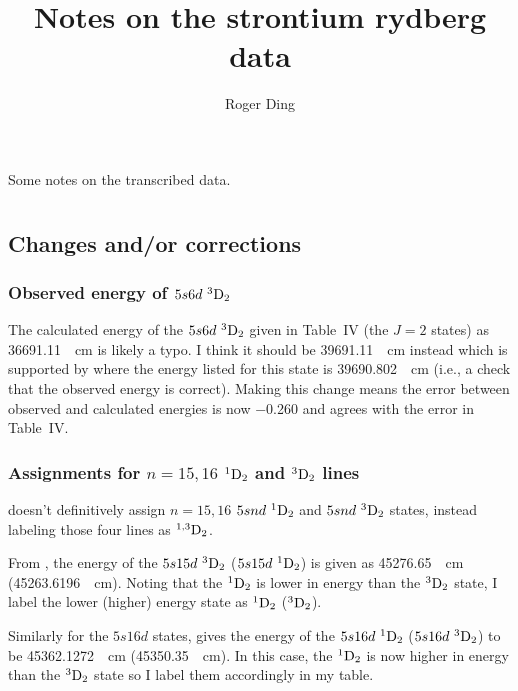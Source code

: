 \documentclass{article}
\title{Notes on the strontium rydberg data}
\author{Roger Ding}
\newcommand{\tsup}{\textsuperscript}													%
\newcommand{\tsub}{\textsubscript}														%
\newcommand{\SLJ}[3]{\tsup{#1}\textnormal{#2}\tsub{#3}}
\newcommand{\nSLJ}[4]{{#1}\textnormal{ }\SLJ{#2}{#3}{#4}}
\begin{document}
\maketitle


Some notes on the transcribed data.

\section{}

\subsection{Changes and/or corrections}

\subsubsection{Observed energy of $\nSLJ{5s6d}{3}{D}{2}$}

The calculated energy of the $\nSLJ{5s6d}{3}{D}{2}$ given in Table~IV (the ${J=2}$ states) as \SI{36691.11}{\per\cm} is likely a typo. I think it should be \SI{39691.11}{\per\cm} instead which is supported by \cite{san_2010} where the energy listed for this state is \SI{39690.802}{\per\cm} (i.e., a check that the observed energy is correct). Making this change means the error between observed and calculated energies is now \num{-0.260} and agrees with the error in Table~IV.

\subsubsection{Assignments for ${n=15,16}$ ${\SLJ{1}{D}{2}}$ and ${\SLJ{3}{D}{2}}$ lines}

\citeauthor{esh_1977} doesn't definitively assign ${n=15,16}$ ${\nSLJ{5snd}{1}{D}{2}}$ and ${\nSLJ{5snd}{3}{D}{2}}$ states, instead labeling those four lines as ${\SLJ{1,3}{D}{2}}$.

From \cite{san_2010}, the energy of the ${\nSLJ{5s15d}{3}{D}{2}}$ (${\nSLJ{5s15d}{1}{D}{2}}$) is given as \SI{45276.65}{\per\cm} (\SI{45263.6196}{\per\cm}). Noting that the $\SLJ{1}{D}{2}$ is lower in energy than the $\SLJ{3}{D}{2}$ state, I label the lower (higher) energy state as $\SLJ{1}{D}{2}$ ($\SLJ{3}{D}{2}$).

Similarly for the $5s16d$ states, \cite{san_2010} gives the energy of the $\nSLJ{5s16d}{1}{D}{2}$ ($\nSLJ{5s16d}{3}{D}{2}$) to be \SI{45362.1272}{\per\cm} (\SI{45350.35}{\per\cm}). In this case, the $\SLJ{1}{D}{2}$ is now higher in energy than the $\SLJ{3}{D}{2}$ state so I label them accordingly in my table.
\end{document}
